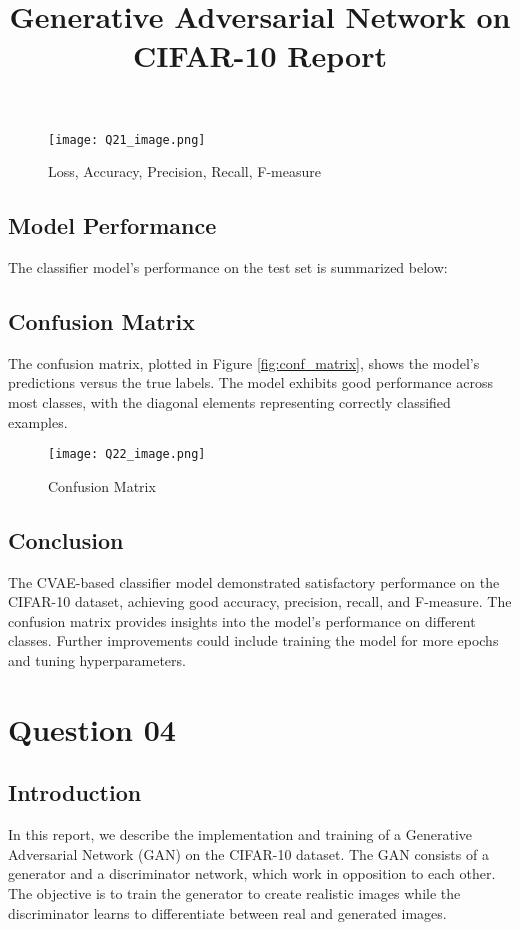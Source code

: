 \documentclass{article}
\begin{document}
\begin{figure}[h]
    \centering
    \texttt{[image: Q21\_image.png]}
    \caption{Loss, Accuracy, Precision, Recall, F-measure}
    \label{fig:my_image}
\end{figure}

\subsection{Model Performance}
The classifier model's performance on the test set is summarized below:



\subsection{Confusion Matrix}
The confusion matrix, plotted in Figure \ref{fig:conf_matrix}, shows the model's predictions versus the true labels. The model exhibits good performance across most classes, with the diagonal elements representing correctly classified examples.
\begin{figure}[h]
    \centering
    \texttt{[image: Q22\_image.png]}
    \caption{Confusion Matrix}
    \label{fig:my_image}
\end{figure}


\subsection{Conclusion}
The CVAE-based classifier model demonstrated satisfactory performance on the CIFAR-10 dataset, achieving good accuracy, precision, recall, and F-measure. The confusion matrix provides insights into the model's performance on different classes. Further improvements could include training the model for more epochs and tuning hyperparameters.








\section{Question 04}
\title{Generative Adversarial Network on CIFAR-10 Report}

\subsection{Introduction}
In this report, we describe the implementation and training of a Generative Adversarial Network (GAN) on the CIFAR-10 dataset. The GAN consists of a generator and a discriminator network, which work in opposition to each other. The objective is to train the generator to create realistic images while the discriminator learns to differentiate between real and generated images.
\end{document}
